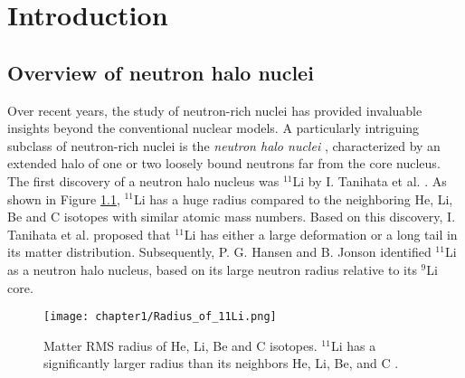 \chapter{Introduction}

\section{Overview of neutron halo nuclei}
Over recent years, the study of neutron-rich nuclei has provided invaluable insights beyond the conventional nuclear models. A particularly intriguing subclass of neutron-rich nuclei is the \textit{neutron halo nuclei} \cite{Tanihata96}\cite{Tanihata13}, characterized by an extended halo of one or two loosely bound neutrons far from the core nucleus. The first discovery of a neutron halo nucleus was $^{11}$Li by I. Tanihata et al. \cite{Tanihata85}. As shown in Figure \ref{fig:Radius_11Li}, $^{11}$Li has a huge radius compared to the neighboring He, Li, Be and C isotopes with similar atomic mass numbers. Based on this discovery, I. Tanihata et al. proposed that $^{11}$Li has either a large deformation or a long tail in its matter distribution. Subsequently, P. G. Hansen and B. Jonson \cite{HansenandJonson} identified $^{11}$Li as a neutron halo nucleus, based on its large neutron radius relative to its $^{9}$Li core.

\begin{figure}
    \centering
    \texttt{[image: chapter1/Radius\_of\_11Li.png]}
    \caption[Matter RMS radius of He, Li, Be and C isotopes]{Matter RMS radius of He, Li, Be and C isotopes. $^{11}$Li has a significantly larger radius than its neighbors He, Li, Be, and C \cite{Tanihata85}.}
    \label{fig:Radius_11Li}
\end{figure}

